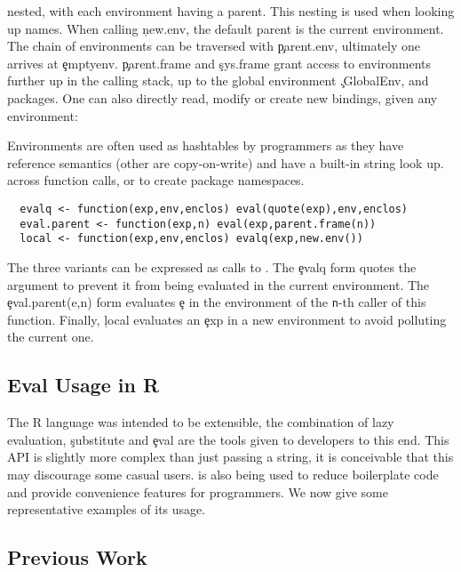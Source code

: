 \documentclass[USenglish,cleveref, autoref, thm-restate]{lipics-v2019}
\begin{document}
nested, with each environment having a parent. This nesting is used
when looking up names. When calling \c{new.env}, the default parent is
the current environment. The chain of environments can be traversed
with \c{parent.env}, ultimately one arrives at \c{emptyenv}.
\c{parent.frame} and \c{sys.frame} grant access to environments
further up in the calling stack, up to the global environment
\c{.GlobalEnv}, and packages. One can also directly read, modify or
create new bindings, given any environment:
\noindent Environments are often used as hashtables by programmers as
they have reference semantics (other are copy-on-write) and have a
built-in string look up. across function calls, or to create package
namespaces.
\begin{lstlisting}
  evalq <- function(exp,env,enclos) eval(quote(exp),env,enclos)
  eval.parent <- function(exp,n) eval(exp,parent.frame(n))
  local <- function(exp,env,enclos) evalq(exp,new.env())
\end{lstlisting}
The three \eval variants can be expressed as calls to \eval. The
\c{evalq} form quotes the argument to prevent it from being evaluated
in the current environment. The \c{eval.parent(e,n)} form evaluates
\c{e} in the environment of the {\tt n}-th caller of this function.
Finally, \c{local} evaluates an \c{exp} in a new environment to
avoid polluting the current one.

\subsection{Eval Usage in R}

The R language was intended to be extensible, the combination of lazy
evaluation, \c{substitute} and \c{eval} are the tools given to
developers to this end. This API is slightly more complex than just
passing a string, it is conceivable that this may discourage some
casual users. \Eval is also being used to reduce boilerplate code and
provide convenience features for programmers. We now give some
representative examples of its usage.



\subsection{Previous Work}
\end{document}
